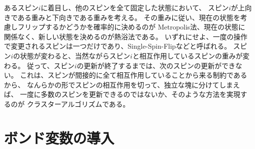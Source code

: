 \documentclass{jarticle}
\begin{document}
あるスピン$i$に着目し、他のスピンを全て固定した状態において、
スピン$i$が上向きである重みと下向きである重みを考える。
その重みに従い、現在の状態を考慮しフリップするかどうかを確率的に決めるのが
Metropolis法、現在の状態に関係なく、新しい状態を決めるのが熱浴法である。
いずれにせよ、一度の操作で変更されるスピンは一つだけであり、Single-Spin-Flipなどと呼ばれる。
スピン$i$の状態が変わると、当然ながらスピン$i$と相互作用しているスピンの重みが変わる。
従って、スピン$i$の更新が終了するまでは、次のスピンの更新ができない。
これは、スピンが間接的に全て相互作用していることから来る制約であるから、
なんらかの形でスピンの相互作用を切って、独立な塊に分けてしまえば、
一度に多数のスピンを更新できるのではないか、そのような方法を実現するのが
クラスターアルゴリズムである。

\section{ボンド変数の導入}
\end{document}
